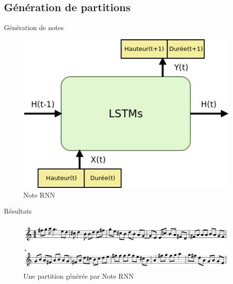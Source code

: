 \documentclass{beamer}
\begin{document}
\subsection{Génération de partitions}

\begin{frame}{Génération de notes}
\begin{figure}
\begin{center}
\includegraphics[scale=0.5]{images/note_rnn.png}
\caption{Note RNN}
\end{center}
\end{figure}
\end{frame}

\begin{frame}{Résultats}
\begin{figure}
\begin{center}
\includegraphics[scale=0.3]{images/note_rnn_result.png}
\caption{Une partition générée par Note RNN}
\end{center}
\end{figure}
\end{frame}
\end{document}

